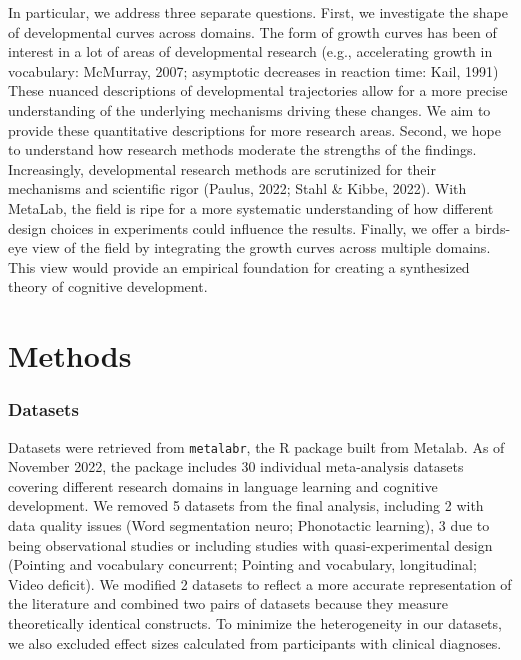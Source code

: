 \documentclass[10pt, letterpaper]{article}
\begin{document}
In particular, we address three separate questions. First, we
investigate the shape of developmental curves across domains. The form
of growth curves has been of interest in a lot of areas of developmental
research (e.g., accelerating growth in vocabulary: McMurray, 2007;
asymptotic decreases in reaction time: Kail, 1991) These nuanced
descriptions of developmental trajectories allow for a more precise
understanding of the underlying mechanisms driving these changes. We aim
to provide these quantitative descriptions for more research areas.
Second, we hope to understand how research methods moderate the
strengths of the findings. Increasingly, developmental research methods
are scrutinized for their mechanisms and scientific rigor (Paulus, 2022;
Stahl \& Kibbe, 2022). With MetaLab, the field is ripe for a more
systematic understanding of how different design choices in experiments
could influence the results. Finally, we offer a birds-eye view of the
field by integrating the growth curves across multiple domains. This
view would provide an empirical foundation for creating a synthesized
theory of cognitive development.

\hypertarget{methods}{%
\section{Methods}\label{methods}}

\hypertarget{datasets}{%
\subsubsection{Datasets}\label{datasets}}

Datasets were retrieved from \texttt{metalabr}, the R package built from
Metalab. As of November 2022, the package includes 30 individual
meta-analysis datasets covering different research domains in language
learning and cognitive development. We removed 5 datasets from the final
analysis, including 2 with data quality issues (Word segmentation neuro;
Phonotactic learning), 3 due to being observational studies or including
studies with quasi-experimental design (Pointing and vocabulary
concurrent; Pointing and vocabulary, longitudinal; Video deficit). We
modified 2 datasets to reflect a more accurate representation of the
literature and combined two pairs of datasets because they measure
theoretically identical constructs. To minimize the heterogeneity in our
datasets, we also excluded effect sizes calculated from participants
with clinical diagnoses.
\end{document}
